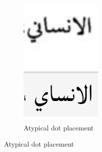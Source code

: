 \begin{figure}[!ht]
\begin{subfigure}[b]{0.3\linewidth}
	\includegraphics[width=\linewidth]{images/image22.png}
	\caption{Atypical dot placement}
	\label{fig3:fig11}
	\end{subfigure}


\end{figure}
